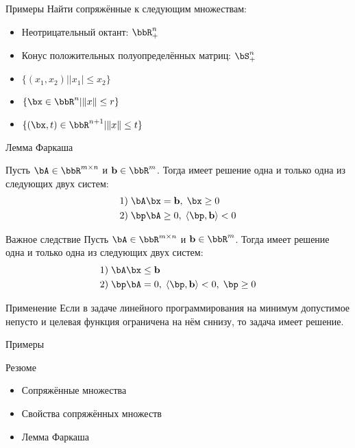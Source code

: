 \documentclass[12pt,russian]{beamer}
\begin{document}
\begin{frame}{Примеры}
Найти сопряжённые к следующим множествам:
\begin{itemize}
\item Неотрицательный октант: $\bbR^n_+$
\item Конус положительных полуопределённых матриц: $\bS^n_+$
\item $\{ (x_1, x_2) | |x_1| \leq x_2 \}$
\item $\{ \bx \in \bbR^n | \| x \| \leq r \}$
\item $\{ (\bx, t) \in \bbR^{n+1} | \| x \| \leq t \}$
\end{itemize}
\end{frame}

\begin{frame}{Лемма Фаркаша}
\scriptsize
\begin{lemma}[Фаркаш]
Пусть $\bA \in \bbR^{m \times n}$ и $\mathbf{b} \in \bbR^m$. Тогда имеет решение одна и только одна из следующих двух систем:
\vspace{-4mm}
\begin{equation*}
\begin{split}
1)& \; \bA\bx = \mathbf{b}, \; \bx \geq 0\\
2)& \; \bp\bA \geq 0, \; \langle \bp, \mathbf{b} \rangle < 0
\end{split}
\end{equation*}
\end{lemma}

\begin{block}{Важное следствие}
Пусть $\bA \in \bbR^{m \times n}$ и $\mathbf{b} \in \bbR^m$. Тогда имеет решение одна и только одна из следующих двух систем:
\vspace{-4mm}
\begin{equation*}
\begin{split}
1)& \; \bA\bx \leq \mathbf{b}\\
2)& \; \bp\bA = 0, \; \langle \bp, \mathbf{b} \rangle < 0, \; \bp \geq 0
\end{split}
\end{equation*}
\end{block}

\begin{block}{Применение}
Если в задаче линейного программирования на минимум допустимое непусто и целевая функция ограничена на нём сннизу, то задача имеет решение.
\end{block}

\end{frame}

\begin{frame}{Примеры}

\end{frame}

\begin{frame}{Резюме}
\begin{itemize}
\item Сопряжённые множества
\item Свойства сопряжённых множеств
\item Лемма Фаркаша
\end{itemize}

\end{frame}
\end{document}
